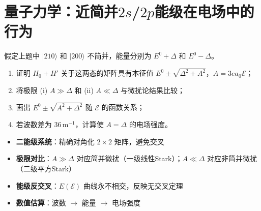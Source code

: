\section{量子力学：近简并\texorpdfstring{$2s$}{2s}/\texorpdfstring{$2p$}{2p}能级在电场中的行为}
\label{sec:near-degenerate-2s2p}

\begin{modelbox}
假定上题中 $|210\rangle$ 和 $|200\rangle$ 不简并，能量分别为 $E^0+\Delta$ 和 $E^0-\Delta$。
\begin{enumerate}
    \item 证明 $H_0+H'$ 关于这两态的矩阵具有本征值 $E^0\pm\sqrt{\Delta^2+A^2}$，$A=3ea_0\mathcal{E}$；
    \item 将极限 (i) $A\gg\Delta$ 和 (ii) $A\ll\Delta$ 与微扰论结果比较；
    \item 画出 $E^0\pm\sqrt{A^2+\Delta^2}$ 随 $\mathcal{E}$ 的函数关系；
    \item 若波数差为 $36\,\text{m}^{-1}$，计算使 $A=\Delta$ 的电场强度。
\end{enumerate}
\end{modelbox}

\begin{tipbox}[考点快速分析]
\begin{itemize}
    \item \textbf{二能级系统}：精确对角化 $2\times2$ 矩阵，避免交叉
    \item \textbf{极限对比}：$A\gg\Delta$ 对应简并微扰（一级线性Stark）；$A\ll\Delta$ 对应非简并微扰（二级平方Stark）
    \item \textbf{能级反交叉}：$E(\mathcal{E})$ 曲线永不相交，反映无交叉定理
    \item \textbf{数值估算}：波数 $\to$ 能量 $\to$ 电场强度
\end{itemize}
\end{tipbox}

